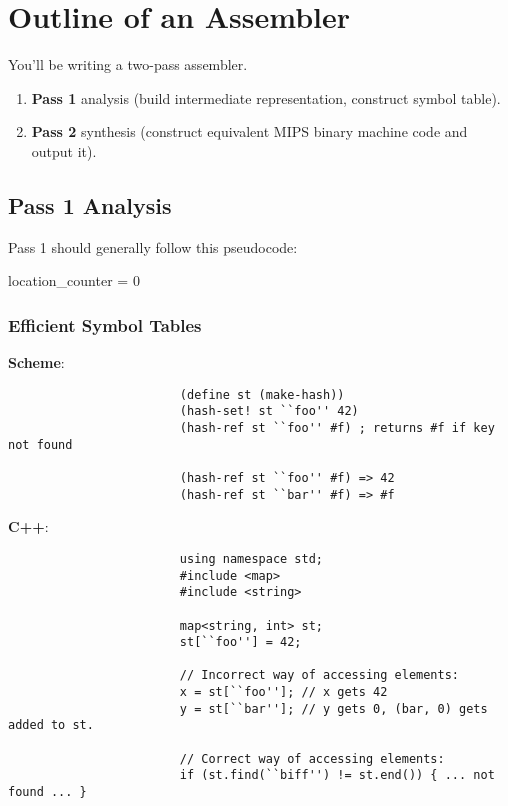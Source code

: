 \documentclass[]{article}
\theoremstyle{definition}
\newcommand{\lecture}[1]{\marginpar{{\footnotesize $\leftarrow$ \underline{#1}}}}
\begin{document}
	\section{Outline of an Assembler} \lecture{January 23, 2013}
		You'll be writing a two-pass assembler.
		\begin{enumerate}
			\item \textbf{Pass 1} \textendash{} analysis (build intermediate representation, construct symbol table).
			\item \textbf{Pass 2} \textendash{} synthesis (construct equivalent MIPS binary machine code and output it).
		\end{enumerate}

		\subsection{Pass 1 \textendash{ } Analysis}
			Pass 1 should generally follow this pseudocode: \\
			\begin{algorithm}[H]
				location\_counter = 0\;
			\end{algorithm}
			
			\subsubsection{Efficient Symbol Tables}
					\textbf{Scheme}:
					\begin{verbatim}
						(define st (make-hash))
						(hash-set! st ``foo'' 42)
						(hash-ref st ``foo'' #f) ; returns #f if key not found

						(hash-ref st ``foo'' #f) => 42
						(hash-ref st ``bar'' #f) => #f
					\end{verbatim}
				\textbf{C++}:
					\begin{verbatim}
						using namespace std;
						#include <map>
						#include <string>

						map<string, int> st;
						st[``foo''] = 42;

						// Incorrect way of accessing elements:
						x = st[``foo'']; // x gets 42
						y = st[``bar'']; // y gets 0, (bar, 0) gets added to st.

						// Correct way of accessing elements:
						if (st.find(``biff'') != st.end()) { ... not found ... }
					\end{verbatim}
\end{document}
